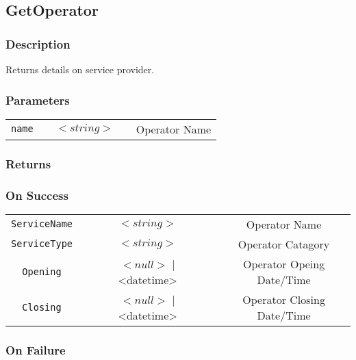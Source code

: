 \documentclass[a4paper,12pt]{article}
\begin{document}
\subsection{GetOperator}

\subsubsection{Description}

Returns details on service provider.

\subsubsection{Parameters}

\begin{tabular}{ccccc}
\verb!name! & \vspace{15mm} & $<string>$ & \vspace{15mm} & Operator Name \\
\end{tabular}

\subsubsection{Returns}

\subsubsection{On Success}

\begin{tabular}{ccccc}
\verb!ServiceName! & \vspace{15mm} & $<string>$ & \vspace{15mm} & Operator Name \\
\verb!ServiceType! & \vspace{15mm} & $<string>$ & \vspace{15mm} & Operator Catagory \\
\verb!Opening! & \vspace{15mm} & $<null>$ | <datetime> & \vspace{15mm} & Operator Opeing Date/Time \\
\verb!Closing! & \vspace{15mm} & $<null>$ | <datetime> & \vspace{15mm} & Operator Closing Date/Time \\
\end{tabular}

\subsubsection{On Failure}
\end{document}
